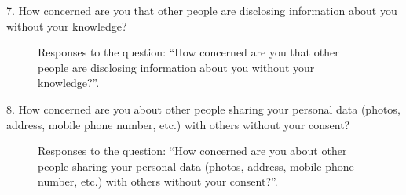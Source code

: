 \vspace{2cm}

7. How concerned are you that other people are disclosing information about you without your knowledge?

\begin{figure}[H]
    \begin{center}
        \caption*{Responses to the question: ``How concerned are you that other people are disclosing information about you without your knowledge?''.}
        \label{fig:survey_s3_q7}
    \end{center}
\end{figure}

8. How concerned are you about other people sharing your personal data (photos, address, mobile phone number, etc.) with others without your consent?

\begin{figure}[H]
    \begin{center}
        \caption*{Responses to the question: ``How concerned are you about other people sharing your personal data (photos, address, mobile phone number, etc.) with others without your consent?''.}
        \label{fig:survey_s3_q8}
    \end{center}
\end{figure}


